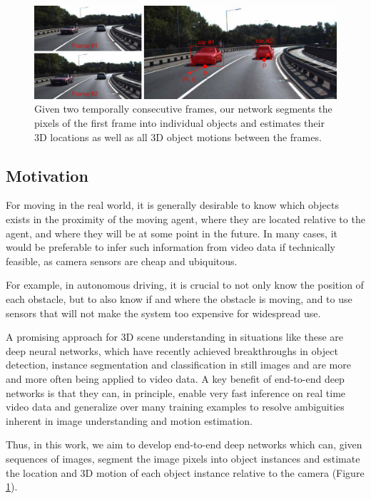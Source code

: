 \begin{figure}[t]
  \centering
  \includegraphics[width=\textwidth]{figures/teaser}
\caption{
Given two temporally consecutive frames,
our network segments the pixels of the first frame into individual objects
and estimates their 3D locations as well as all 3D object motions between the frames.
}
\label{figure:teaser}
\end{figure}

\subsection{Motivation}

For moving in the real world, it is generally desirable to know which objects exists
in the proximity of the moving agent,
where they are located relative to the agent,
and where they will be at some point in the future.
In many cases, it would be preferable to infer such information from video data
if technically feasible, as camera sensors are cheap and ubiquitous.

For example, in autonomous driving, it is crucial to not only know the position
of each obstacle, but to also know if and where the obstacle is moving,
and to use sensors that will not make the system too expensive for widespread use.

A promising approach for 3D scene understanding in situations like these are deep neural
networks, which have recently achieved breakthroughs in object detection, instance segmentation and classification
in still images and are more and more often being applied to video data.
A key benefit of end-to-end deep networks is that they can, in principle,
enable very fast inference on real time video data and generalize
over many training examples to resolve ambiguities inherent in image understanding
and motion estimation.

Thus, in this work, we aim to develop end-to-end deep networks which can, given
sequences of images, segment the image pixels into object instances and estimate
the location and 3D motion of each object instance relative to the camera
(Figure \ref{figure:teaser}).


